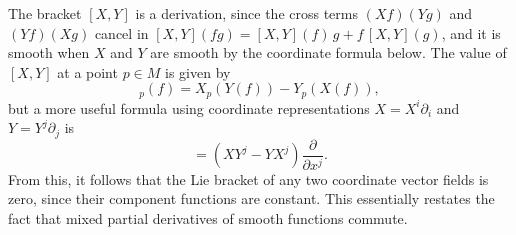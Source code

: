 \documentclass[a4paper,12pt]{article}
\begin{document}
The bracket $[X, Y]$ is a derivation, since the cross terms $(Xf)(Yg)$ and $(Yf)(Xg)$ cancel in $[X, Y](fg) = [X, Y](f) \, g + f \, [X, Y](g)$, and it is smooth when $X$ and $Y$ are smooth by the coordinate formula below.
The value of $[X, Y]$ at a point $p \in M$ is given by
\begin{equation}
    [X, Y]_p(f) = X_p(Y(f)) - Y_p(X(f)),
\end{equation}
but a more useful formula using coordinate representations $X = X^i \partial_i$ and $Y = Y^j \partial_j$ is
\begin{equation}
    [X, Y] = (XY^j - YX^j) \frac{\partial}{\partial x^j}.
\end{equation}
From this, it follows that the Lie bracket of any two coordinate vector fields is zero, since their component functions are constant.
This essentially restates the fact that mixed partial derivatives of smooth functions commute.
\end{document}
